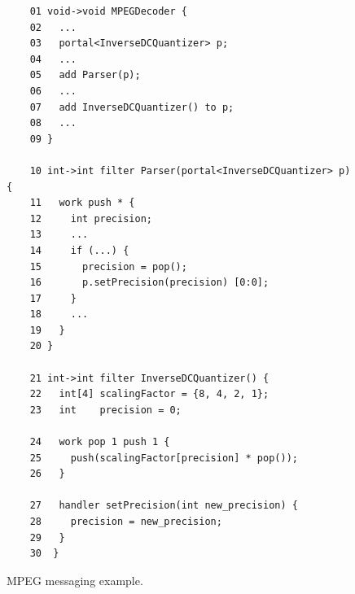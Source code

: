 
\begin{figure}[t]
  \begin{scriptsize}
    \begin{verbatim}
	01 void->void MPEGDecoder {
	02   ...
	03   portal<InverseDCQuantizer> p;
	04   ...
	05   add Parser(p);
	06   ...
	07   add InverseDCQuantizer() to p;
	08   ...
	09 }

	10 int->int filter Parser(portal<InverseDCQuantizer> p) {
	11   work push * {
	12     int precision;
	13     ...
	14     if (...) {
	15       precision = pop();
	16       p.setPrecision(precision) [0:0];
	17     }
	18     ...
	19   }
	20 }

	21 int->int filter InverseDCQuantizer() {
	22   int[4] scalingFactor = {8, 4, 2, 1};
	23   int    precision = 0;

	24   work pop 1 push 1 {
	25     push(scalingFactor[precision] * pop());
	26   }

	27   handler setPrecision(int new_precision) {
	28     precision = new_precision;
	29   }
	30  }
    \end{verbatim}
  \end{scriptsize}
  \caption{MPEG messaging example.}
  \label{fig:messaging}
\end{figure}

